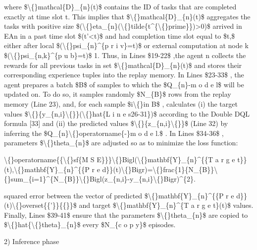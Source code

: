 \documentclass{article}
\begin{document}
where \$\textbackslash\{\}mathcal\{D\}\_\{n\}(t)\$ contains the ID of tasks that are completed exactly at time slot t. This implies that \$\textbackslash\{\}mathcal\{D\}\_\{n\}(t)\$ aggregates the tasks with positive size \$(\textbackslash\{\}eta\_\{n\}(\textbackslash\{\}tilde\{t\textasciicircum{}\{\textbackslash\{\}prime\}\})>0)\$ arrived in EAn in a past time slot \$(t'<t)\$ and had completion time slot equal to \$t,\$ either after local \$(\textbackslash\{\}psi\_\{n\}\textasciicircum{}\{p r i v\}=t)\$ or external computation at node k \$(\textbackslash\{\}psi\_\{n,k\}\textasciicircum{}\{p u b\}=t)\$ 1. Thus, in Lines \$19-22\$ ,the agent n collects the rewards for all previous tasks in set \$\textbackslash\{\}mathcal\{D\}\_\{n\}(t)\$ and stores their corresponding experience tuples into the replay memory. In Lines \$23-33\$ , the agent prepares a batch \$B\$ of samples to which the \$Q\_\{n\}-m o d e l\$ will be updated on. To do so, it samples randomly \$N\_\{B\}\$ rows from the replay memory (Line 23), and, for each sample \$i\textbackslash\{\}in B\$ , calculates (i) the target values \$\textbackslash\{\}\{y\_\{n,i\}\textbackslash\{\}\}(\textbackslash\{\}hat\{L i n e s26-31\})\$ according to the Double DQL formula [33] and (ii) the predicted values \$\textbackslash\{\}\{z\_\{n,i\}\textbackslash\{\}\}\$ (Line 32) by inferring the \$Q\_\{n\}\textbackslash\{\}operatorname\{-\}m o d e l.\$ . In Lines \$34-36\$ , parameters \$\textbackslash\{\}theta\_\{n\}\$ are adjusted so as to minimize the loss function:

\textbackslash\{\}operatorname\{\{\textbackslash\{\}sf\{M S E\}\}\}\textbackslash\{\}Bigl(\textbackslash\{\}mathbf\{Y\}\_\{n\}\textasciicircum{}\{\{T a r g e t\}\}(t),\textbackslash\{\}mathbf\{Y\}\_\{n\}\textasciicircum{}\{\{P r e d\}\}(t)\textbackslash\{\}Bigr)=\textbackslash\{\}frac\{1\}\{N\_\{B\}\}\textbackslash\{\}sum\_\{i=1\}\textasciicircum{}\{N\_\{B\}\}\textbackslash\{\}Bigl(z\_\{n,i\}-y\_\{n,i\}\textbackslash\{\}Bigr)\textasciicircum{}\{2\}.

squared error between the vector of predicted \$\textbackslash\{\}mathbf\{Y\}\_\{n\}\textasciicircum{}\{\{P r e d\}\}(t)\textbackslash\{\}overset\{\{'\}\}\{\{\}\}\$ and target \$\textbackslash\{\}mathbf\{Y\}\_\{n\}\textasciicircum{}\{T a r g e t\}(t)\$ values. Finally, Lines \$39-41\$ ensure that the parameters \$\textbackslash\{\}theta\_\{n\}\$ are copied to \$\textbackslash\{\}hat\{\textbackslash\{\}theta\}\_\{n\}\$ every \$N\_\{c o p y\}\$ episodes.

2) Inference phase
\end{document}
